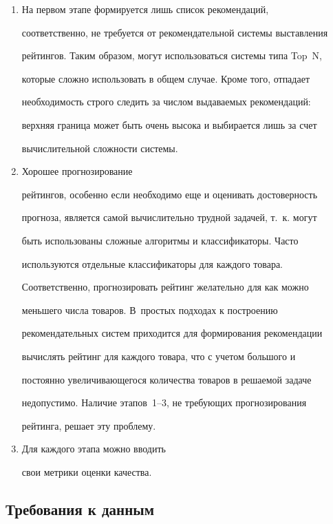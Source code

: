 \begin{enumerate}


\item На первом этапе формируется лишь список рекомендаций,


соответственно, не требуется от рекомендательной системы выставления


рейтингов. Таким образом, могут использоваться системы типа Top~N,


которые сложно использовать в общем случае. Кроме того, отпадает


необходимость строго следить за числом выдаваемых рекомендаций:


верхняя граница может быть очень высока и выбирается лишь за счет


вычислительной сложности системы. 


\item Хорошее прогнозирование


рейтингов, особенно если необходимо еще и оценивать достоверность


прогноза, является самой вычислительно трудной задачей, т.~к. могут


быть использованы сложные алгоритмы и классификаторы. Часто


используются отдельные классификаторы для каждого товара.


Соответственно, прогнозировать рейтинг желательно для как можно


меньшего числа товаров. В~простых подходах к построению


рекомендательных систем приходится для формирования рекомендации


вычислять рейтинг для каждого товара, что с учетом большого и


постоянно увеличивающегося количества товаров в решаемой задаче


недопустимо. Наличие этапов~1--3, не требующих прогнозирования


рейтинга, решает эту проблему. 


\item Для каждого этапа можно вводить


свои метрики оценки качества.


\end{enumerate}





\subsection{Требования к данным}






